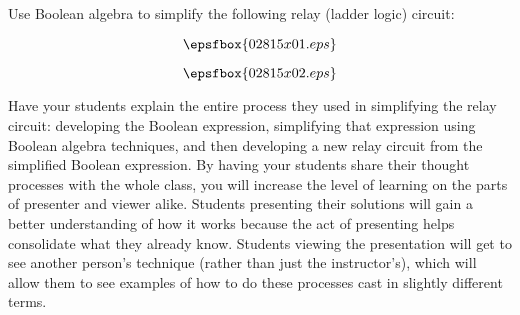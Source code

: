 

Use Boolean algebra to simplify the following relay (ladder logic) circuit:

$$\epsfbox{02815x01.eps}$$







$$\epsfbox{02815x02.eps}$$







Have your students explain the entire process they used in simplifying the relay circuit: developing the Boolean expression, simplifying that expression using Boolean algebra techniques, and then developing a new relay circuit from the simplified Boolean expression.  By having your students share their thought processes with the whole class, you will increase the level of learning on the parts of presenter and viewer alike.  Students presenting their solutions will gain a better understanding of how it works because the act of presenting helps consolidate what they already know.  Students viewing the presentation will get to see another person's technique (rather than just the instructor's), which will allow them to see examples of how to do these processes cast in slightly different terms.




